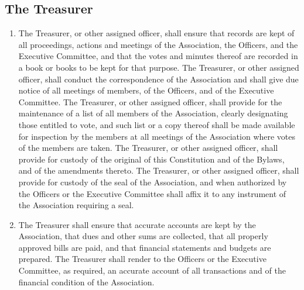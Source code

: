 \subsection{The Treasurer}
\begin{enumerate}
	\item The Treasurer, or other assigned officer, shall ensure that records are kept of all proceedings, actions and meetings of the Association, the Officers, and the Executive Committee, and that the votes and minutes thereof are recorded in a book or books to be kept for that purpose. The Treasurer, or other assigned officer, shall conduct the correspondence of the Association and shall give due notice of all meetings of members, of the Officers, and of the Executive Committee. The Treasurer, or other assigned officer, shall provide for the maintenance of a list of all members of the Association, clearly designating those entitled to vote, and such list or a copy thereof shall be made available for inspection by the members at all meetings of the Association where votes of the members are taken. The Treasurer, or other assigned officer, shall provide for custody of the original of this Constitution and of the Bylaws, and of the amendments thereto. The Treasurer, or other assigned officer, shall provide for custody of the seal of the Association, and when authorized by the Officers or the Executive Committee shall affix it to any instrument of the Association requiring a seal.
	\item The Treasurer shall ensure that accurate accounts are kept by the Association, that dues and other sums are collected, that all properly approved bills are paid, and that financial statements and budgets are prepared. The Treasurer shall render to the Officers or the Executive Committee, as required, an accurate account of all transactions and of the financial condition of the Association.
\end{enumerate}

